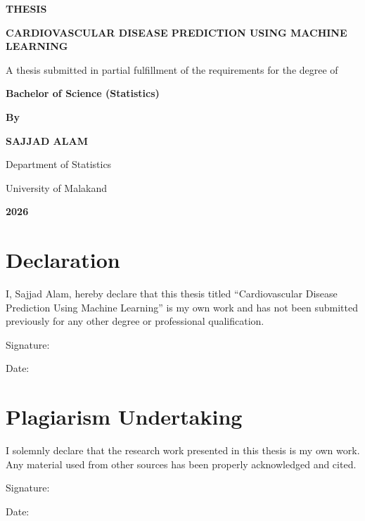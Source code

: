 \documentclass[12pt, a4paper, oneside]{book}
\newcommand{\thesistitle}{Cardiovascular Disease Prediction Using Machine Learning}
\newcommand{\thesisauthor}{Sajjad Alam}
\newcommand{\thesisdegree}{Bachelor of Science (Statistics)}
\newcommand{\thesisdept}{Department of Statistics}
\newcommand{\thesisuni}{University of Malakand}
\newcommand{\thesisyear}{2026}
\begin{document}
\onehalfspacing

\frontmatter

\begin{titlepage}
  \thispagestyle{empty}
  \begin{center}
    {\bfseries\MakeUppercase{Thesis}\par}
    \vspace{18pt}
    {\bfseries\MakeUppercase{\thesistitle}\par}
    \vspace{18pt}
    A thesis submitted in partial fulfillment of the requirements for the degree of\par
    \vspace{10pt}
    {\bfseries \thesisdegree\par}
    \vspace{14pt}
    {\bfseries By\par}
    \vspace{10pt}
    {\bfseries\MakeUppercase{\thesisauthor}\par}
    \vspace{18pt}
    \thesisdept\par
    \vspace{6pt}
    \thesisuni\par
    \vspace{18pt}
    {\bfseries\MakeUppercase{\thesisyear}\par}
  \end{center}
\end{titlepage}

\setcounter{page}{2}

\chapter*{Declaration}
I, \thesisauthor, hereby declare that this thesis titled ``\thesistitle'' is my own work and has not been submitted previously for any other degree or professional qualification.
\par\bigskip
Signature:\dotfill\par
Date:\dotfill

\chapter*{Plagiarism Undertaking}
I solemnly declare that the research work presented in this thesis is my own work. Any material used from other sources has been properly acknowledged and cited.
\par\bigskip
Signature:\dotfill\par
Date:\dotfill
\end{document}
